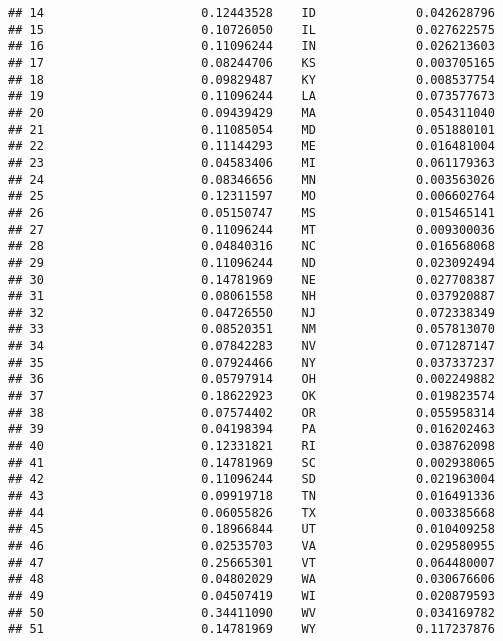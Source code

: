 \documentclass{article}\usepackage[]{graphicx}\usepackage[]{color}
\makeatletter
\newenvironment{kframe}{%
 \def\at@end@of@kframe{}%
 \ifinner\ifhmode%
  \def\at@end@of@kframe{\end{minipage}}%
  \begin{minipage}{\columnwidth}%
 \fi\fi%
 \def\FrameCommand##1{\hskip\@totalleftmargin \hskip-\fboxsep
 \colorbox{shadecolor}{##1}\hskip-\fboxsep
     \hskip-\linewidth \hskip-\@totalleftmargin \hskip\columnwidth}%
 \MakeFramed {\advance\hsize-\width
   \@totalleftmargin\z@ \linewidth\hsize
   \@setminipage}}%
 {\par\unskip\endMakeFramed%
 \at@end@of@kframe}
\newenvironment{knitrout}{}{} %
\makeatother
\begin{document}
\begin{knitrout}
\begin{kframe}
\begin{verbatim}
## 14                      0.12443528    ID              0.042628796
## 15                      0.10726050    IL              0.027622575
## 16                      0.11096244    IN              0.026213603
## 17                      0.08244706    KS              0.003705165
## 18                      0.09829487    KY              0.008537754
## 19                      0.11096244    LA              0.073577673
## 20                      0.09439429    MA              0.054311040
## 21                      0.11085054    MD              0.051880101
## 22                      0.11144293    ME              0.016481004
## 23                      0.04583406    MI              0.061179363
## 24                      0.08346656    MN              0.003563026
## 25                      0.12311597    MO              0.006602764
## 26                      0.05150747    MS              0.015465141
## 27                      0.11096244    MT              0.009300036
## 28                      0.04840316    NC              0.016568068
## 29                      0.11096244    ND              0.023092494
## 30                      0.14781969    NE              0.027708387
## 31                      0.08061558    NH              0.037920887
## 32                      0.04726550    NJ              0.072338349
## 33                      0.08520351    NM              0.057813070
## 34                      0.07842283    NV              0.071287147
## 35                      0.07924466    NY              0.037337237
## 36                      0.05797914    OH              0.002249882
## 37                      0.18622923    OK              0.019823574
## 38                      0.07574402    OR              0.055958314
## 39                      0.04198394    PA              0.016202463
## 40                      0.12331821    RI              0.038762098
## 41                      0.14781969    SC              0.002938065
## 42                      0.11096244    SD              0.021963004
## 43                      0.09919718    TN              0.016491336
## 44                      0.06055826    TX              0.003385668
## 45                      0.18966844    UT              0.010409258
## 46                      0.02535703    VA              0.029580955
## 47                      0.25665301    VT              0.064480007
## 48                      0.04802029    WA              0.030676606
## 49                      0.04507419    WI              0.020879593
## 50                      0.34411090    WV              0.034169782
## 51                      0.14781969    WY              0.117237876

\end{verbatim}
\end{kframe}
\end{knitrout}
\end{document}
